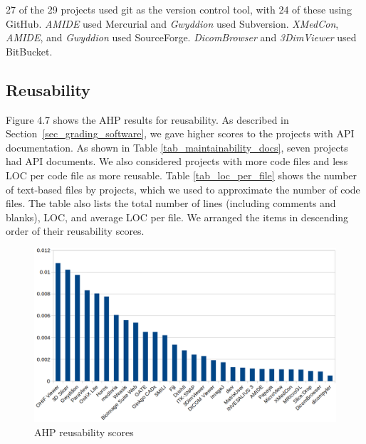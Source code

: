 \documentclass[final, 3p, times, authoryear]{elsarticle}
\begin{document}
27 of the 29 projects used git as the version control tool, with 24 of these
using GitHub. \textit{AMIDE} used Mercurial and \textit{Gwyddion} used
Subversion. \textit{XMedCon}, \textit{AMIDE}, and \textit{Gwyddion} used
SourceForge. \textit{DicomBrowser} and \textit{3DimViewer} used BitBucket. 

\subsection{Reusability} \label{sec_result_reusability}

Figure 4.7 shows the AHP results for reusability. As described in
Section~\ref{sec_grading_software}, we gave higher scores to the projects with
API documentation. As shown in Table \ref{tab_maintainability_docs}, seven
projects had API documents. We also considered projects with more code files and
less LOC per code file as more reusable. Table \ref{tab_loc_per_file} shows the
number of text-based files by projects, which we used to approximate the number
of code files. The table also lists the total number of lines (including
comments and blanks), LOC, and average LOC per file. We arranged the items in
descending order of their reusability scores.

\begin{figure}[ht]
\includegraphics[scale=0.38]{figures/reusability_scores.png}
\caption{AHP reusability scores}
\label{fg_reusability_scores}
\end{figure}
\end{document}
